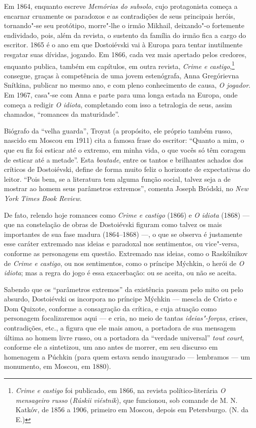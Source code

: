 Em 1864, enquanto escreve \emph{Memórias do subsolo}, cujo
protagonista começa a encarnar cruamente os paradoxos e as
contradições de seus principais heróis, tornando"-se seu
protótipo, morre"-lhe o irmão Mikhail, deixando"-o fortemente
endividado, pois, além da revista, o sustento da família do
irmão fica a cargo do escritor. 1865 é o ano em que Dostoiévski
vai à Europa para tentar inutilmente resgatar suas dívidas,
jogando. Em 1866, cada vez mais apertado pelos credores, enquanto
publica, também em capítulos, em outra revista, \emph{Crime e
castigo},\footnote{\emph{Crime e castigo} foi publicado, em 1866,
na revista político-literária \emph{O mensageiro russo}
(\emph{Rúskii viéstnik}), que funcionou, sob comande de M. N.
Katkóv, de 1856 a 1906, primeiro em Moscou, depois em Petersburgo.
(N. da E.)} consegue, graças à competência de uma jovem
estenógrafa, Anna Gregórievna Snítkina, publicar no mesmo ano,
e com pleno conhecimento de causa, \emph{O jogador}. Em 1967,
casa"-se com Anna e parte para uma longa estada na Europa, onde
começa a redigir \emph{O idiota}, completando com isso a
tetralogia de seus, assim chamados, ``romances da maturidade''.

Biógrafo da ``velha guarda'', Troyat (a propósito, ele próprio
também russo, nascido em Moscou em 1911) cita a famosa frase
do escritor: ``Quanto a mim, o que eu fiz foi esticar até o
extremo, em minha vida, o que vocês só têm coragem de esticar até
a metade''. Esta \emph{boutade}, entre os tantos e brilhantes achados
dos críticos de Dostoiévski, define de forma muito feliz o
horizonte de expectativas do leitor. ``Pois bem, se a
literatura tem alguma função social, talvez seja a de mostrar
ao homem seus parâmetros extremos'', comenta Joseph Bródski,
no \emph{New York Times Book Review}.

De fato, relendo hoje romances como \emph{Crime e castigo}
(1866) e \emph{O idiota} (1868) --- que na constelação de
obras de Dostoiévski figuram como talvez os mais importantes
de sua fase madura (1864--1868) ---, o que se observa é
justamente esse caráter extremado nas ideias e paradoxal
nos sentimentos, ou vice"-versa, conforme as personagens em
questão. Extremado nas ideias, como o Raskólnikov de
\emph{Crime e castigo}, ou nos sentimentos, como o príncipe
Mýchkin, o herói de \emph{O idiota}; mas a regra do jogo é essa
exacerbação: ou se aceita, ou não se aceita. 

Sabendo que os ``parâmetros
extremos'' da existência passam pelo mito ou pelo absurdo, Dostoiévski
os incorpora no príncipe Mýchkin --- mescla de Cristo e Dom Quixote,
conforme a consagração da crítica, e cuja atuação como personagem
focalizaremos aqui --- e cria, no meio de tantas \emph{ideias"-forças},
crises, contradições, etc., a figura que ele mais amou,
a portadora de sua mensagem última ao homem livre russo, ou
a portadora da ``verdade universal'' \emph{tout court},
conforme ele a sintetizou, um ano antes de morrer, em seu
discurso em homenagem a Púchkin (para quem estava sendo
inaugurado --- lembramos --- um monumento, em Moscou, em 1880).

